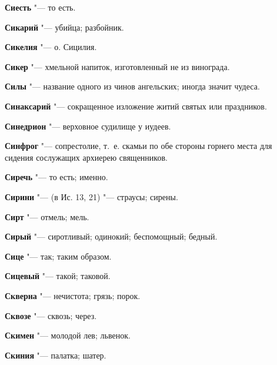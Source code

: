 \begin{mymulticols}{2}
\noindent\textbf{Сиесть} "--- то есть. 




\noindent\textbf{Сикарий} "--- убийца; разбойник. 




\noindent\textbf{Сикелия} "--- о. Сицилия. 




\noindent\textbf{Сикер} "--- хмельной напиток, изготовленный не из винограда. 




\noindent\textbf{Силы} "--- название одного из чинов ангельских; иногда значит чудеса. 




\noindent\textbf{Синаксарий} "--- сокращенное изложение житий святых или праздников. 




\noindent\textbf{Синедрион} "--- верховное судилище у иудеев. 




\noindent\textbf{Синфрог} "--- сопрестолие, т.~е. скамьи по обе стороны горнего места для сидения сослужащих архиерею священников. 




\noindent\textbf{Сиречь} "--- то есть; именно. 




\noindent\textbf{Сирини} "--- (в Ис. 13, 21) "--- страусы; сирены. 




\noindent\textbf{Сирт} "--- отмель; мель. 




\noindent\textbf{Сирый} "--- сиротливый; одинокий; беспомощный; бедный. 




\noindent\textbf{Сице} "--- так; таким образом. 




\noindent\textbf{Сицевый} "--- такой; таковой. 




\noindent\textbf{Скверна} "--- нечистота; грязь; порок. 




\noindent\textbf{Сквозе} "--- сквозь; через. 




\noindent\textbf{Скимен} "--- молодой лев; львенок. 




\noindent\textbf{Скиния} "--- палатка; шатер. 





\end{mymulticols}
